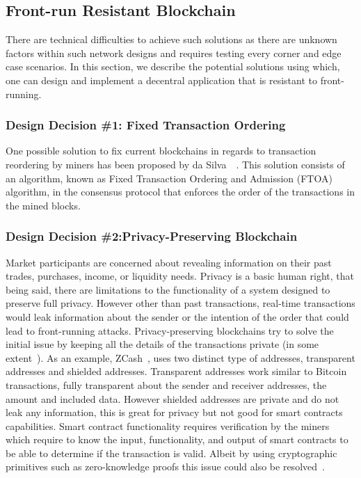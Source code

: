\subsection{Front-run Resistant Blockchain}
There are technical difficulties to achieve such solutions as there are unknown factors within such network designs and requires testing every corner and edge case scenarios. In this section, we describe the potential solutions using which, one can design and implement a decentral application that is resistant to front-running.

\subsubsection{Design Decision \#1: Fixed Transaction Ordering\newline}
One possible solution to fix current blockchains in regards to transaction reordering by miners has been proposed by da Silva~\etal~\cite{fixedordering2018silva}. This solution consists of an algorithm, known as Fixed Transaction Ordering and Admission (FTOA) algorithm, in the consensus protocol that enforces the order of the transactions in the mined blocks.

\subsubsection{Design Decision \#2:Privacy-Preserving Blockchain\newline}
Market participants are concerned about revealing information on their past trades, purchases, income, or liquidity needs. Privacy is a basic human right, that being said, there are limitations to the functionality of a system designed to preserve full privacy. However other than past transactions, real-time transactions would leak information about the sender or the intention of the order that could lead to front-running attacks. Privacy-preserving blockchains try to solve the initial issue by keeping all the details of the transactions private (in some extent~\cite{miller2017empirical, kappos2018empirical}). 
As an example, ZCash~\cite{hopwood2016zcash}, uses two distinct type of addresses, transparent addresses and shielded addresses. Transparent addresses work similar to Bitcoin transactions, fully transparent about the sender and receiver addresses, the amount and included data. However shielded addresses are private and do not leak any information, this is great for privacy but not good for smart contracts capabilities. Smart contract functionality requires verification by the miners which require to know the input, functionality, and output of smart contracts to be able to determine if the transaction is valid. Albeit by using cryptographic primitives such as zero-knowledge proofs this issue could also be resolved~\cite{kosba2016hawk}. 

